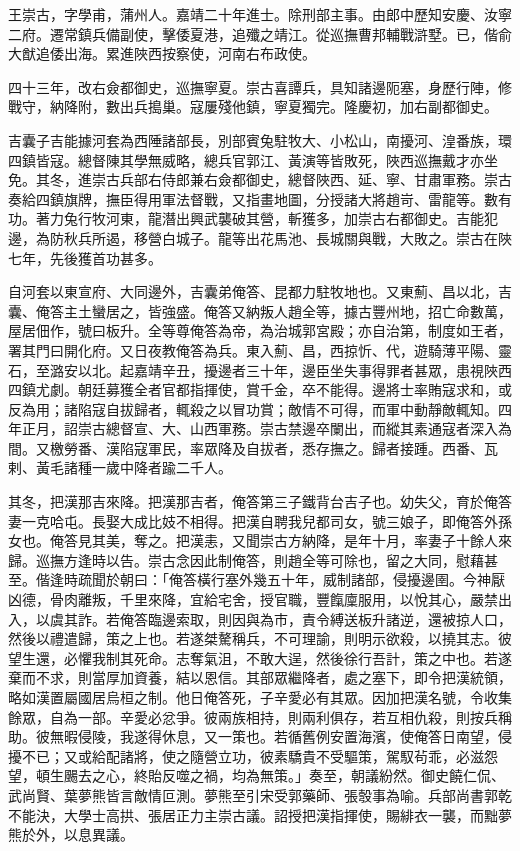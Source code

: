 \begin{pinyinscope}
王崇古，字學甫，蒲州人。嘉靖二十年進士。除刑部主事。由郎中歷知安慶、汝寧二府。遷常鎮兵備副使，擊倭夏港，追殲之靖江。從巡撫曹邦輔戰滸墅。已，偕俞大猷追倭出海。累進陜西按察使，河南右布政使。

四十三年，改右僉都御史，巡撫寧夏。崇古喜譚兵，具知諸邊阨塞，身歷行陣，修戰守，納降附，數出兵搗巢。寇屢殘他鎮，寧夏獨完。隆慶初，加右副都御史。

吉囊子吉能據河套為西陲諸部長，別部賓兔駐牧大、小松山，南擾河、湟番族，環四鎮皆寇。總督陳其學無威略，總兵官郭江、黃演等皆敗死，陜西巡撫戴才亦坐免。其冬，進崇古兵部右侍郎兼右僉都御史，總督陜西、延、寧、甘肅軍務。崇古奏給四鎮旗牌，撫臣得用軍法督戰，又指畫地圖，分授諸大將趙岢、雷龍等。數有功。著力兔行牧河東，龍潛出興武襲破其營，斬獲多，加崇古右都御史。吉能犯邊，為防秋兵所遏，移營白城子。龍等出花馬池、長城關與戰，大敗之。崇古在陜七年，先後獲首功甚多。

自河套以東宣府、大同邊外，吉囊弟俺答、昆都力駐牧地也。又東薊、昌以北，吉囊、俺答主土蠻居之，皆強盛。俺答又納叛人趙全等，據古豐州地，招亡命數萬，屋居佃作，號曰板升。全等尊俺答為帝，為治城郭宮殿；亦自治第，制度如王者，署其門曰開化府。又日夜教俺答為兵。東入薊、昌，西掠忻、代，遊騎薄平陽、靈石，至潞安以北。起嘉靖辛丑，擾邊者三十年，邊臣坐失事得罪者甚眾，患視陜西四鎮尤劇。朝廷募獲全者官都指揮使，賞千金，卒不能得。邊將士率賄寇求和，或反為用；諸陷寇自拔歸者，輒殺之以冒功賞；敵情不可得，而軍中動靜敵輒知。四年正月，詔崇古總督宣、大、山西軍務。崇古禁邊卒闌出，而縱其素通寇者深入為間。又檄勞番、漢陷寇軍民，率眾降及自拔者，悉存撫之。歸者接踵。西番、瓦剌、黃毛諸種一歲中降者踰二千人。

其冬，把漢那吉來降。把漢那吉者，俺答第三子鐵背台吉子也。幼失父，育於俺答妻一克哈屯。長娶大成比妓不相得。把漢自聘我兒都司女，號三娘子，即俺答外孫女也。俺答見其美，奪之。把漢恚，又聞崇古方納降，是年十月，率妻子十餘人來歸。巡撫方逢時以告。崇古念因此制俺答，則趙全等可除也，留之大同，慰藉甚至。偕逢時疏聞於朝曰：「俺答橫行塞外幾五十年，威制諸部，侵擾邊圉。今神厭凶德，骨肉離叛，千里來降，宜給宅舍，授官職，豐餼廩服用，以悅其心，嚴禁出入，以虞其詐。若俺答臨邊索取，則因與為市，責令縛送板升諸逆，還被掠人口，然後以禮遣歸，策之上也。若遂桀驁稱兵，不可理諭，則明示欲殺，以撓其志。彼望生還，必懼我制其死命。志奪氣沮，不敢大逞，然後徐行吾計，策之中也。若遂棄而不求，則當厚加資養，結以恩信。其部眾繼降者，處之塞下，即令把漢統領，略如漢置屬國居烏桓之制。他日俺答死，子辛愛必有其眾。因加把漢名號，令收集餘眾，自為一部。辛愛必忿爭。彼兩族相持，則兩利俱存，若互相仇殺，則按兵稱助。彼無暇侵陵，我遂得休息，又一策也。若循舊例安置海濱，使俺答日南望，侵擾不已；又或給配諸將，使之隨營立功，彼素驕貴不受驅策，駕馭茍乖，必滋怨望，頓生颺去之心，終貽反噬之禍，均為無策。」奏至，朝議紛然。御史饒仁侃、武尚賢、葉夢熊皆言敵情叵測。夢熊至引宋受郭藥師、張彀事為喻。兵部尚書郭乾不能決，大學士高拱、張居正力主崇古議。詔授把漢指揮使，賜緋衣一襲，而黜夢熊於外，以息異議。


\end{pinyinscope}
